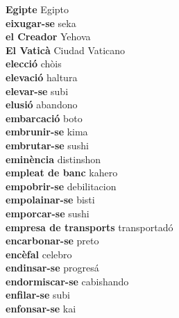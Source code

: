 \textbf{ Egipte  } Egipto \\
\textbf{ eixugar-se  } seka \\
\textbf{ el Creador  } Yehova \\
\textbf{ El Vaticà  } Ciudad Vaticano \\
\textbf{ elecció  } chòis \\
\textbf{ elevació  } haltura \\
\textbf{ elevar-se  } subi \\
\textbf{ elusió  } abandono \\
\textbf{ embarcació  } boto \\
\textbf{ embrunir-se  } kima \\
\textbf{ embrutar-se  } sushi \\
\textbf{ eminència  } distinshon \\
\textbf{ empleat de banc  } kahero \\
\textbf{ empobrir-se  } debilitacion \\
\textbf{ empolainar-se  } bisti \\
\textbf{ emporcar-se  } sushi \\
\textbf{ empresa de transports  } transportadó \\
\textbf{ encarbonar-se  } preto \\
\textbf{ encèfal  } celebro \\
\textbf{ endinsar-se  } progresá \\
\textbf{ endormiscar-se  } cabishando \\
\textbf{ enfilar-se  } subi \\
\textbf{ enfonsar-se  } kai \\

